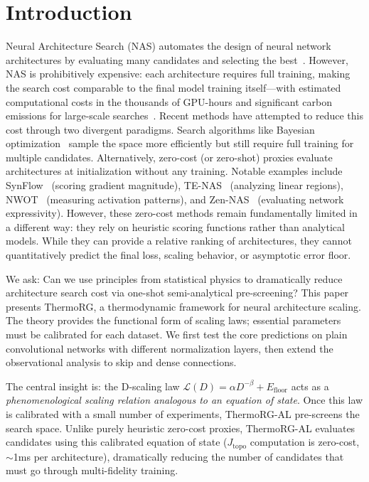 \documentclass[11pt, a4paper]{article}
\theoremstyle{plain}
\begin{document}
\section{Introduction}

Neural Architecture Search (NAS) automates the design of neural network architectures by evaluating many candidates and selecting the best~\citep{zoph2016neural,elsken2019neural}. However, NAS is prohibitively expensive: each architecture requires full training, making the search cost comparable to the final model training itself---with estimated computational costs in the thousands of GPU-hours and significant carbon emissions for large-scale searches~\citep{strubell2019energy}. Recent methods have attempted to reduce this cost through two divergent paradigms. Search algorithms like Bayesian optimization~\citep{kandasamy2018nas} sample the space more efficiently but still require full training for multiple candidates. Alternatively, zero-cost (or zero-shot) proxies evaluate architectures at initialization without any training. Notable examples include SynFlow~\citep{abdelfattah2021no} (scoring gradient magnitude), TE-NAS~\citep{chen2021te} (analyzing linear regions), NWOT~\citep{mellor2021neural} (measuring activation patterns), and Zen-NAS~\citep{lin2021zennas} (evaluating network expressivity). However, these zero-cost methods remain fundamentally limited in a different way: they rely on heuristic scoring functions rather than analytical models. While they can provide a relative ranking of architectures, they cannot quantitatively predict the final loss, scaling behavior, or asymptotic error floor.

We ask: Can we use principles from statistical physics to dramatically reduce architecture search cost via one-shot semi-analytical pre-screening? This paper presents ThermoRG, a thermodynamic framework for neural architecture scaling. The theory provides the functional form of scaling laws; essential parameters must be calibrated for each dataset. We first test the core predictions on plain convolutional networks with different normalization layers, then extend the observational analysis to skip and dense connections.

The central insight is: the D-scaling law $\mathcal{L}(D)=\alpha D^{-\beta}+E_{\mathrm{floor}}$ acts as a \emph{phenomenological scaling relation analogous to an equation of state}. Once this law is calibrated with a small number of experiments, ThermoRG-AL pre-screens the search space. Unlike purely heuristic zero-cost proxies, ThermoRG-AL evaluates candidates using this calibrated equation of state ($J_{\mathrm{topo}}$ computation is zero-cost, $\sim$1ms per architecture), dramatically reducing the number of candidates that must go through multi-fidelity training.
\end{document}
